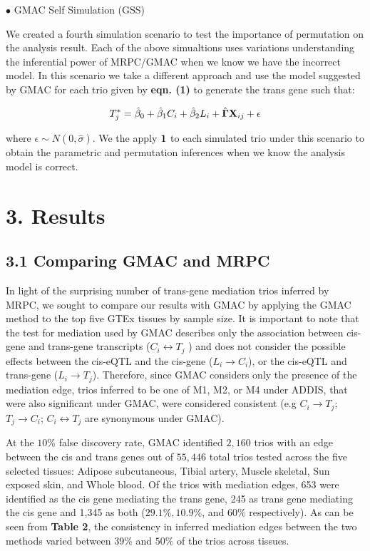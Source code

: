 \documentclass[
]{article}
\begin{document}
\indent \(\bullet\) GMAC Self Simulation (GSS)

We created a fourth simulation scenario to test the importance of
permutation on the analysis result. Each of the above simualtions uses
variations understanding the inferential power of MRPC/GMAC when we know
we have the incorrect model. In this scenario we take a different
approach and use the model suggested by GMAC for each trio given by
\textbf{eqn. (1)} to generate the trans gene such that:

\[ T_j^{\ast} = \hat{\beta}_0 + \hat{\beta}_1 C_i + \hat{\beta}_2 L_i + \hat{{\bf \Gamma}} {\bf X}_{ij} + \epsilon  \]

where \(\epsilon \sim N(0, \hat{\sigma})\). We the apply \({\bf 1}\) to
each simulated trio under this scenario to obtain the parametric and
permutation inferences when we know the analysis model is correct.

\section*{3. Results}
\subsection*{3.1 Comparing GMAC and MRPC}

In light of the surprising number of trans-gene mediation trios inferred
by MRPC, we sought to compare our results with GMAC by applying the GMAC
method to the top five GTEx tissues by sample size. It is important to
note that the test for mediation used by GMAC describes only the
association between cis-gene and trans-gene transcripts
(\(C_i \leftrightarrow T_j\) ) and does not consider the possible
effects between the cis-eQTL and the cis-gene (\(L_i \rightarrow C_i\)),
or the cis-eQTL and trans-gene (\(L_i \rightarrow T_j\)). Therefore,
since GMAC considers only the presence of the mediation edge, trios
inferred to be one of M1, M2, or M4 under ADDIS, that were also
significant under GMAC, were considered consistent (e.g
\(C_i \rightarrow T_j\); \(T_j \rightarrow C_i\);
\(C_i \leftrightarrow T_j\) are synonymous under GMAC).

At the \(10\%\) false discovery rate, GMAC identified \(2,160\) trios
with an edge between the cis and trans genes out of \(55,446\) total
trios tested across the five selected tissues: Adipose subcutaneous,
Tibial artery, Muscle skeletal, Sun exposed skin, and Whole blood. Of
the trios with mediation edges, 653 were identified as the cis gene
mediating the trans gene, 245 as trans gene mediating the cis gene and
1,345 as both (\(29.1\%, 10.9\%\), and \(60\%\) respectively). As can be
seen from \textbf{Table 2}, the consistency in inferred mediation edges
between the two methods varied between \(39\%\) and \(50\%\) of the
trios across tissues.
\end{document}
